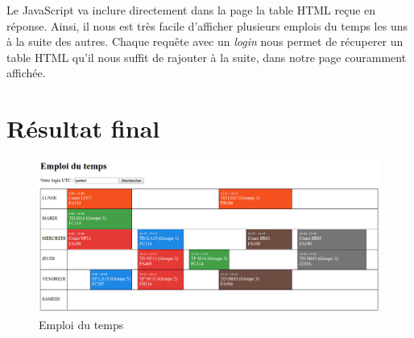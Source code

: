 \medskip

Le JavaScript va inclure directement dans la page la table HTML reçue en réponse. Ainsi, il nous est très facile d'afficher plusieurs emplois du temps les uns à la suite des autres. Chaque requête avec un \textit{login} nous permet de récuperer un table HTML qu'il nous suffit de rajouter à la suite, dans notre page couramment affichée.

\section{Résultat final}

\begin{figure}[H]
    \centering\includegraphics[width=1.00\textwidth]{images/edt.png}
    \caption{Emploi du temps}
\end{figure}
